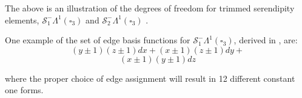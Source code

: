 \documentclass[landscape,a0paper,fontscale=0.285]{baposter} %
\begin{document}
\begin{poster}
{\begin{center}
The above is an illustration of the degrees of freedom for trimmed serendipity elements, $\mathcal{S}_1^-\Lambda^1(\square_3)$ and $\mathcal{S}_2^-\Lambda^1(\square_3)$ .
\end{center}

One example of the set of edge basis functions for $\mathcal{S}_1^-\Lambda^1(\square_3)$, derived in \cite{gillette2019computational}, are:
\begin{equation*}
      (y\pm 1)(z\pm 1)dx + (x\pm 1)(z\pm 1) dy +
\end{equation*}
\begin{equation*}
    (x \pm 1)(y \pm 1)dz
\end{equation*}

where the proper choice of edge assignment will result in 12 different constant one forms.

}








\end{poster}
\end{document}

